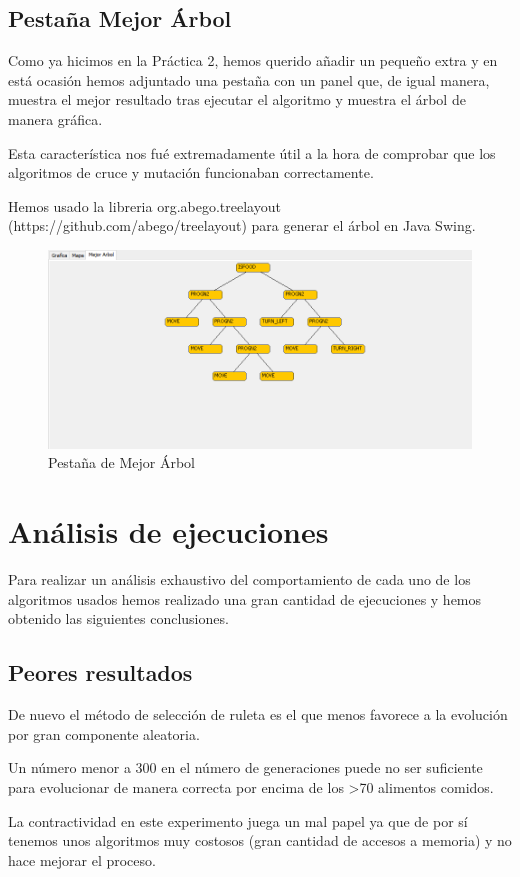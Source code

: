 \documentclass{article}
\begin{document}
\subsection{Pestaña Mejor Árbol}
Como ya hicimos en la Práctica 2, hemos querido añadir un pequeño extra y en está ocasión hemos adjuntado una pestaña con un panel que, de igual manera, muestra el mejor resultado tras ejecutar el algoritmo y muestra el árbol de manera gráfica.\par Esta característica nos fué extremadamente útil a la hora de comprobar que los algoritmos de cruce y mutación funcionaban correctamente.\par
Hemos usado la libreria org.abego.treelayout (https://github.com/abego/treelayout) para generar el árbol en Java Swing. \par  

\begin{figure}[h]
	\centering
	\includegraphics[scale=0.4]{./images/marbol.png}
	\caption{Pestaña de Mejor Árbol}
\end{figure}

\newpage
\section{Análisis de ejecuciones}
Para realizar un análisis exhaustivo del comportamiento de cada uno de los algoritmos usados hemos realizado una gran cantidad de ejecuciones y hemos obtenido las siguientes conclusiones.
\subsection{Peores resultados}

De nuevo el método de selección de ruleta es el que menos favorece a la evolución por gran componente aleatoria.\par 
Un número menor a 300 en el número de generaciones puede no ser suficiente para evolucionar de manera correcta por encima de los >70 alimentos comidos.\par La contractividad en este experimento juega un mal papel ya que de por sí tenemos unos algoritmos muy costosos (gran cantidad de accesos a memoria) y no hace mejorar el proceso.
\end{document}

